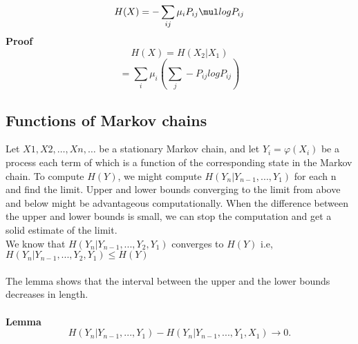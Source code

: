\documentclass[10pt,twocolumn,letterpaper]{article}
\begin{document}
\begin{equation*}
    H(X) = -\sum_{ij}\mu_i P_{ij}\mul logP_{ij}
\end{equation*}
\textbf{Proof}
\begin{equation*}
    H ( X ) = H (X_2 |X_1 ) 
\end{equation*}
\begin{equation*}
   = \sum_i \mu_i(\sum_j -P_{ij}logP_{ij})
\end{equation*}
\subsection{Functions of Markov chains}
Let
\begin{math} X 1 , X 2 , \dots , X n , \dots \end{math} be a stationary Markov chain, and let \begin{math} Y_i = \varphi (X_i)\end{math} be a process each term of which is a function of the corresponding state in the Markov chain. To compute \begin{math}
H ( Y ) \end{math}, we might compute \begin{math}
H (Y_n |Y_{n-1} , . . . , Y_1 ) \end{math} for each n and ﬁnd the limit.
Upper and lower bounds converging to the limit from above and below might be advantageous computationally. When the difference between the upper and lower bounds is small, we can stop the computation and get a solid estimate of the limit.\\ We know that  \begin{math}  H (Y_n |Y_{n-1} , . . . , Y_2 , Y_1 )  \end{math} converges to \begin{math} H(Y) \end{math} i.e, \begin{math} H (Y_n |Y_{n-1} , . . . , Y_2 , Y_1 )  \leq H(Y) \end{math}\\
\\The lemma shows that the interval between the upper and the lower bounds decreases in length.\\
\\ \textbf{Lemma}\\
\begin{equation*}
    H (Y_n |Y_{n-1} , . . . , Y_1 ) - H (Y_n |Y_{n-1} , . . . , Y_1 , X_1 ) \to 0.
\end{equation*}
\end{document}
